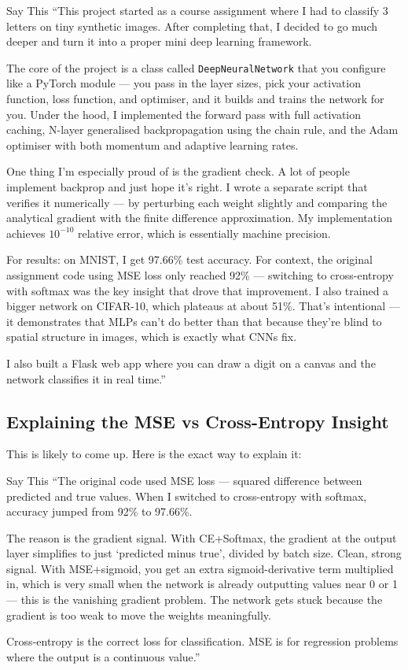 \documentclass[12pt, a4paper]{article}
\begin{document}
\begin{interviewbox}{Say This}
``This project started as a course assignment where I had to classify 3 letters on tiny synthetic images. After completing that, I decided to go much deeper and turn it into a proper mini deep learning framework.

The core of the project is a class called \texttt{DeepNeuralNetwork} that you configure like a PyTorch module --- you pass in the layer sizes, pick your activation function, loss function, and optimiser, and it builds and trains the network for you. Under the hood, I implemented the forward pass with full activation caching, N-layer generalised backpropagation using the chain rule, and the Adam optimiser with both momentum and adaptive learning rates.

One thing I'm especially proud of is the gradient check. A lot of people implement backprop and just hope it's right. I wrote a separate script that verifies it numerically --- by perturbing each weight slightly and comparing the analytical gradient with the finite difference approximation. My implementation achieves $10^{-10}$ relative error, which is essentially machine precision.

For results: on MNIST, I get 97.66\% test accuracy. For context, the original assignment code using MSE loss only reached 92\% --- switching to cross-entropy with softmax was the key insight that drove that improvement. I also trained a bigger network on CIFAR-10, which plateaus at about 51\%. That's intentional --- it demonstrates that MLPs can't do better than that because they're blind to spatial structure in images, which is exactly what CNNs fix.

I also built a Flask web app where you can draw a digit on a canvas and the network classifies it in real time.''
\end{interviewbox}

\subsection{Explaining the MSE vs Cross-Entropy Insight}

This is likely to come up. Here is the exact way to explain it:

\begin{interviewbox}{Say This}
``The original code used MSE loss --- squared difference between predicted and true values. When I switched to cross-entropy with softmax, accuracy jumped from 92\% to 97.66\%.

The reason is the gradient signal. With CE+Softmax, the gradient at the output layer simplifies to just `predicted minus true', divided by batch size. Clean, strong signal. With MSE+sigmoid, you get an extra sigmoid-derivative term multiplied in, which is very small when the network is already outputting values near 0 or 1 --- this is the vanishing gradient problem. The network gets stuck because the gradient is too weak to move the weights meaningfully.

Cross-entropy is the correct loss for classification. MSE is for regression problems where the output is a continuous value.''
\end{interviewbox}
\end{document}

